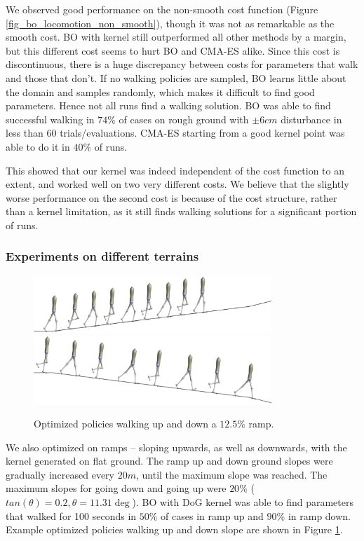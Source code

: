 We observed good performance on the non-smooth cost function (Figure \ref{fig_bo_locomotion_non_smooth}), though it was not as remarkable as the smooth cost. BO with kernel still outperformed all other methods by a margin, but this different cost seems to hurt BO and \mbox{CMA-ES} alike. Since this cost is discontinuous, there is a huge discrepancy between costs for parameters that walk and those that don't. If no walking policies are sampled, BO learns little about the domain and samples randomly, which makes it difficult to find good parameters. Hence not all runs find a walking solution. BO was able to find successful walking in $74\%$ of cases on rough ground with $\pm 6 cm$ disturbance in less than 60 trials/evaluations. \mbox{CMA-ES} starting from a good kernel point was able to do it in $40\%$ of runs. 

This showed that our kernel was indeed independent of the cost function to an extent, and worked well on two very different costs. We believe that the slightly worse performance on the second cost is because of the cost structure, rather than a kernel limitation, as it still finds walking solutions for a significant portion of runs.  


\subsubsection{Experiments on different terrains}

\begin{figure}[t]
\centering
\includegraphics[width=0.8\textwidth]{img/rampup.png}
\vspace{10px}
\includegraphics[width=0.8\textwidth]{img/rampdown.png}
\caption{Optimized policies walking up and down a $12.5 \%$ ramp.}
\label{fig_ramp}
\end{figure}

We also optimized on ramps -- sloping upwards, as well as downwards, with the kernel generated on flat ground. The ramp up and down ground slopes were gradually increased every $20m$, until the maximum slope was reached. The maximum slopes for going down and going up were $20\%$ ($tan(\theta) = 0.2, \theta=11.31\deg$). BO with DoG kernel was able to find parameters that walked for 100 seconds in $50\%$ of cases in ramp up and $90\%$ in ramp down. Example optimized policies walking up and down slope are shown in Figure \ref{fig_ramp}.

